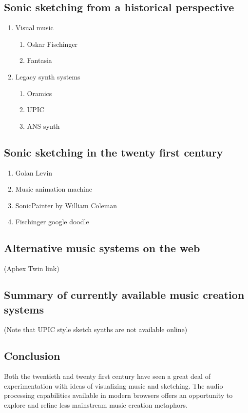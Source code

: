 \documentclass[a4paper,12pt]{article}
\begin{document}
\subsection{Sonic sketching from a historical perspective}
\label{sec:org586cff9}
\begin{enumerate}
\item Visual music
\begin{enumerate}
\item Oskar Fischinger
\item Fantasia
\end{enumerate}
\item Legacy synth systems
\begin{enumerate}
\item Oramics
\item UPIC
\item ANS synth
\end{enumerate}
\end{enumerate}
\subsection{Sonic sketching in the twenty first century}
\label{sec:orgd8b677b}
\begin{enumerate}
\item Golan Levin \cite{levin_painterly_2000}
\item Music animation machine \cite{malinowski_music_2017}
\item SonicPainter by William Coleman \cite{coleman_sonicpainter:_2015}
\item Fischinger google doodle
\end{enumerate}
\subsection{Alternative music systems on the web}
\label{sec:org4582e4e}
(Aphex Twin link)
\subsection{Summary of currently available music creation systems}
\label{sec:org764cfbe}
(Note that UPIC style sketch synths are not available online)
\subsection{Conclusion}
\label{sec:org9011e2c}
Both the twentieth and twenty first century have seen a great deal of
experimentation with ideas of visualizing music and sketching. The audio
processing capabilities available in modern browsers offers an opportunity to
explore and refine less mainstream music creation metaphors.
\end{document}
